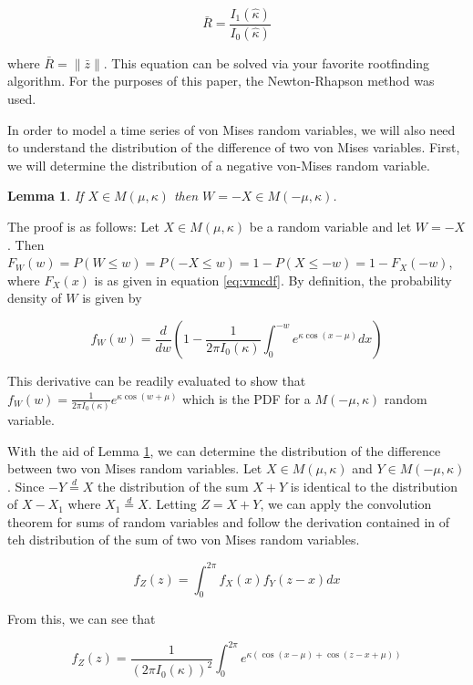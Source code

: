 \documentclass[11pt]{article}
\newtheorem{lemma}{Lemma}[section]
\numberwithin{equation}{section}
\numberwithin{figure}{section}
\begin{document}
\begin{equation}
\label{eq:kmle}
\bar{R} = \frac{I_1(\hat{\kappa})}{I_0(\hat{\kappa})}
\end{equation}

where $\bar{R} = \|\bar{z}\|$. This equation can be solved via your favorite rootfinding algorithm. For the purposes of this paper, the Newton-Rhapson method was used.  

In order to model a time series of von Mises random variables, we will also need to understand the distribution of the difference of two von Mises variables. First, we will determine the distribution of a negative von-Mises random variable. 

\begin{lemma}\label{nvm}
If $X\in M(\mu, \kappa)$ then $W = -X \in M(-\mu,\kappa)$.
\end{lemma}

The proof is as follows: Let $X\in M(\mu, \kappa)$ be a random variable and let $W = -X$. Then $F_W(w) = P(W\le w) = P(-X\le w) = 1-P(X\le -w) = 1-F_X(-w)$, where $F_X(x)$ is as given in equation \ref{eq:vmcdf}. By definition, the probability density of $W$ is given by

\begin{equation}\label{eq:wpdf}
f_W(w) = \frac{d}{dw}\left( 1-\frac{1}{2\pi I_0(\kappa)}\int_0^{-w}e^{\kappa \cos(x-\mu)}dx \right)
\end{equation}

This derivative can be readily evaluated to show that $f_W(w) = \frac{1}{2\pi I_0(\kappa)}e^{\kappa \cos(w+\mu)}$ which is the PDF for a $M(-\mu, \kappa)$ random variable.

With the aid of Lemma \ref{nvm}, we can determine the distribution of the difference between two von Mises random variables. Let $X \in M(\mu, \kappa)$ and $Y \in M(-\mu, \kappa)$. Since $-Y \overset{d}{=}X$ the distribution of the sum $X+Y$ is identical to the distribution of $X-X_1$ where $X_1 \overset{d}{=}X$. Letting $Z = X+Y$, we can apply the convolution theorem for sums of random variables and follow the derivation contained in \cite{Kanti} of teh distribution of the sum of two von Mises random variables. 

\begin{equation}\label{eq:rvsum}
f_Z(z) = \int_0^{2\pi}f_X(x)f_Y(z-x)dx
\end{equation}

From this, we can see that 

\begin{equation}\label{eq:vmsum}
f_Z(z) = \frac{1}{(2\pi I_0(\kappa))^2}\int_0^{2\pi} e^{\kappa(\cos(x-\mu)+\cos(z-x+\mu))}
\end{equation}
\end{document}
